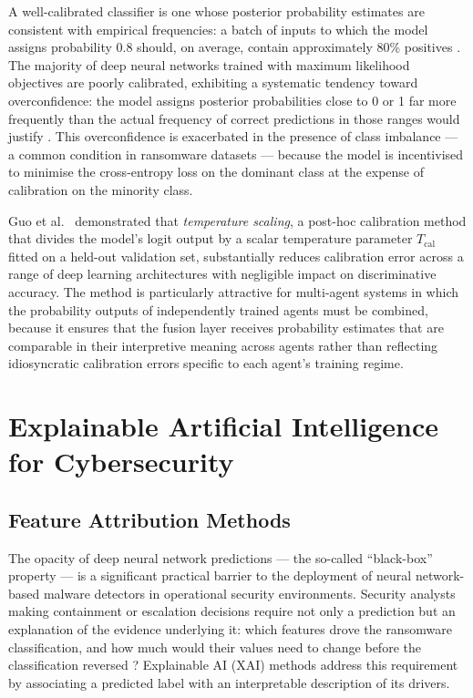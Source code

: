 A well-calibrated classifier is one whose posterior probability estimates are consistent with
empirical frequencies: a batch of inputs to which the model assigns probability 0.8 should,
on average, contain approximately 80\% positives \cite{guo2017calibration}.
The majority of deep neural networks trained with maximum likelihood objectives are
poorly calibrated, exhibiting a systematic tendency toward overconfidence: the model assigns
posterior probabilities close to 0 or 1 far more frequently than the actual frequency of
correct predictions in those ranges would
justify \cite{guo2017calibration, malinin2018predictive}.
This overconfidence is exacerbated in the presence of class imbalance — a common condition
in ransomware datasets — because the model is incentivised to minimise the cross-entropy loss
on the dominant class at the expense of calibration on the minority class.

Guo et al.\ \cite{guo2017calibration} demonstrated that \emph{temperature scaling}, a
post-hoc calibration method that divides the model's logit output by a scalar temperature
parameter $T_{\mathrm{cal}}$ fitted on a held-out validation set, substantially reduces
calibration error across a range of deep learning architectures with negligible impact on
discriminative accuracy.
The method is particularly attractive for multi-agent systems in which the probability
outputs of independently trained agents must be combined, because it ensures that the fusion
layer receives probability estimates that are comparable in their interpretive meaning across
agents rather than reflecting idiosyncratic calibration errors specific to each agent's
training regime.

\section{Explainable Artificial Intelligence for Cybersecurity}
\label{sec:lit_xai}

\subsection{Feature Attribution Methods}
\label{sec:lit_shap}

The opacity of deep neural network predictions — the so-called ``black-box'' property — is a
significant practical barrier to the deployment of neural network-based malware detectors in
operational security environments.
Security analysts making containment or escalation decisions require not only a prediction
but an explanation of the evidence underlying it: which features drove the ransomware
classification, and how much would their values need to change before the classification
reversed \cite{lundberg2017shap, ribeiro2016lime}?
Explainable AI (XAI) methods address this requirement by associating a predicted label with
an interpretable description of its drivers.

